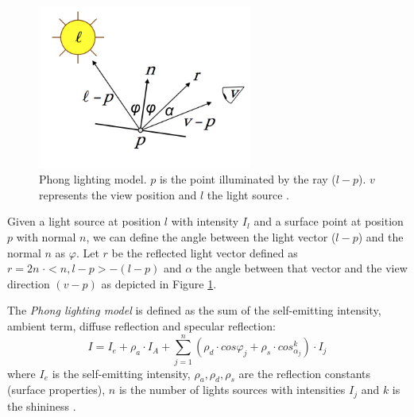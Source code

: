 \begin{figure}[h!]
  \centering
  \includegraphics[width=7cm]{images/lighting}
\caption{Phong lighting model. $p$ is the point illuminated by the ray ($l-p$). $v$ represents the view position and $l$ the light source \cite{SLIDE:ICORSI}.} \label{figure:lighting}
\end{figure}
Given a light source at position $l$ with intensity $I_l$ and a surface point at position $p$ with normal $n$,
we can define the angle between the light vector ($l-p$) and the normal $n$ as $\varphi$.
Let $r$ be the reflected light vector defined as $r = 2 n \; \cdot <n, l - p> - (l-p)$ and $\alpha$ the angle between that vector and the view direction $(v - p)$ as depicted in Figure \ref{figure:lighting}.

The \textit{Phong lighting model} is defined as the sum of the self-emitting intensity, ambient term, diffuse reflection and specular reflection:
$$ I = I_e + {\rho}_a \cdot I_A + \sum_{j=1}^n ({\rho}_d \cdot cos {\varphi}_j + {\rho}_s \cdot cos_{\alpha_j}^k) \cdot I_j$$ where $I_e$ is the self-emitting intensity, ${\rho}_a, {\rho}_d, {\rho}_s$ are the reflection constants (surface properties), $n$ is the number of lights sources with intensities $I_j$ and $k$ is the shininess \cite{SLIDE:ICORSI}.


